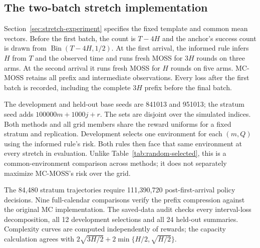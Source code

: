 \subsection{The two-batch stretch implementation}
Section~\ref{sec:stretch-experiment} specifies the fixed template and
common mean vectors. Before the first batch, the count is $T-4H$ and
the anchor's success count is drawn from $\operatorname{Bin}(T-4H,1/2)$.
At the first arrival, the informed rule infers $H$ from $T$ and the
observed time and runs fresh MOSS for $3H$ rounds on three arms.
At the second arrival it runs fresh MOSS for $H$ rounds on five arms.
MC-MOSS retains all prefix and intermediate observations. Every loss
after the first batch is recorded, including the complete $3H$ prefix
before the final batch.

The development and held-out base seeds are 841013 and 951013; the
stratum seed adds $100000m+1000j+r$. The sets are disjoint over the
simulated indices. Both methods and all grid members share the reward
uniforms for a fixed stratum and replication. Development selects one
environment for each $(m,Q)$ using the informed rule's risk. Both rules
then face that same environment at every stretch in evaluation.
Unlike Table~\ref{tab:random-selected}, this is a common-environment
comparison across methods; it does not separately maximize MC-MOSS's
risk over the grid.

The 84,480 stratum trajectories require 111,390,720 post-first-arrival
policy decisions. Nine full-calendar comparisons verify the prefix
compression against the original MC implementation. The saved-data
audit checks every interval-loss decomposition, all 12 development
selections and all 24 held-out summaries. Complexity curves are
computed independently of rewards; the capacity calculation agrees
with $2\sqrt{3H/2}+2\min\{H/2,\sqrt{H/2}\}$.
